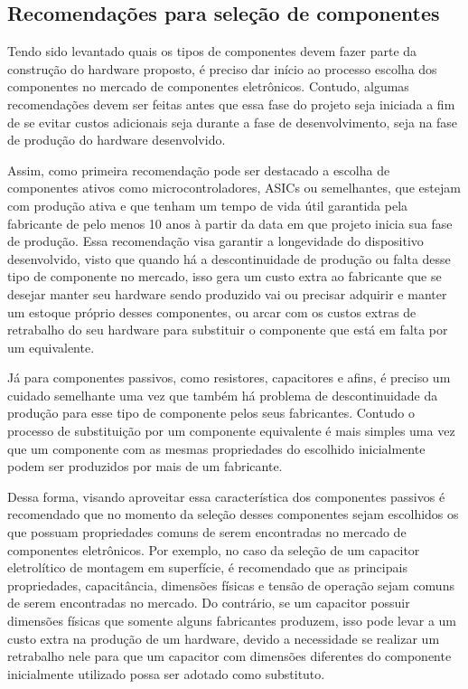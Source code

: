 \subsection{Recomendações para seleção de componentes}\label{subsec:recomendacoes_componentes}

Tendo sido levantado quais os tipos de componentes devem fazer parte da construção do hardware proposto, é preciso dar início ao processo escolha dos componentes no mercado de componentes eletrônicos. Contudo, algumas recomendações devem ser feitas antes que essa fase do projeto seja iniciada a fim de se evitar custos adicionais seja durante a fase de desenvolvimento, seja na fase de produção do hardware desenvolvido. 

Assim, como primeira recomendação pode ser destacado a escolha de componentes ativos como microcontroladores, \gls{ASIC}s ou semelhantes, que estejam com produção ativa e que tenham um tempo de vida útil garantida pela fabricante de pelo menos 10 anos à partir da data em que projeto inicia sua fase de produção. Essa recomendação visa garantir a longevidade do dispositivo desenvolvido, visto que quando há a descontinuidade de produção ou falta desse tipo de componente no mercado, isso gera um custo extra ao fabricante que se desejar manter seu hardware sendo produzido vai ou precisar adquirir e manter um estoque próprio desses componentes, ou arcar com os custos extras de retrabalho do seu hardware para substituir o componente que está em falta por um equivalente. 

Já para componentes passivos, como resistores, capacitores e afins, é preciso um cuidado semelhante uma vez que também há problema de descontinuidade da produção para esse tipo de componente pelos seus fabricantes. Contudo o processo de substituição por um componente equivalente é mais simples uma vez que um componente com as mesmas propriedades do escolhido inicialmente podem ser produzidos por mais de um fabricante. 

Dessa forma, visando aproveitar essa característica dos componentes passivos é recomendado que no momento da seleção desses componentes sejam escolhidos os que possuam propriedades comuns de serem encontradas no mercado de componentes eletrônicos. Por exemplo, no caso da seleção de um capacitor eletrolítico de montagem em superfície, é recomendado que as principais propriedades, capacitância, dimensões físicas e tensão de operação sejam comuns de serem encontradas no mercado. Do contrário, se um capacitor possuir dimensões físicas que somente alguns fabricantes produzem, isso pode levar a um custo extra na produção de um hardware, devido a necessidade se realizar um retrabalho nele para que um capacitor com dimensões diferentes do componente inicialmente utilizado possa ser adotado como substituto. 

